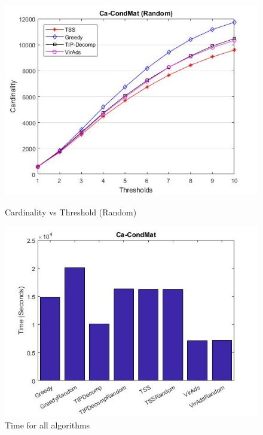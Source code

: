 \begin{figure}[h!]
\begin{minipage}[t]{0.50\textwidth}
\includegraphics[width=\linewidth,keepaspectratio=true]{images/ca-condmatresultrandom.jpg}
\caption{Cardinality vs Threshold (Random)}

\end{minipage}
\begin{minipage}[t]{0.50\textwidth}
\includegraphics[width=\linewidth,keepaspectratio=true]{images/condmattime.jpg}
\caption{Time for all algorithms}
\end{minipage}
\end{figure}

